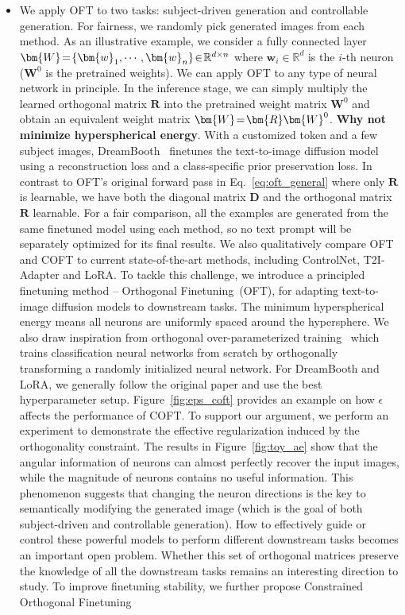\begin{itemize}[leftmargin=*,nosep]
\begin{itemize}[leftmargin=*,nosep]
The conventional finetuning strategy typically uses gradient descent with a small learning rate to update a model (or certain layers of a model). \item We apply OFT to two tasks: subject-driven generation and controllable generation. For fairness, we randomly pick generated images from each method. As an illustrative example, we consider a fully connected layer $\thickmuskip=2mu \medmuskip=2mu \bm{W}=\{\bm{w}_1,\cdots,\bm{w}_n\}\in\mathbb{R}^{d\times n}$ where $\bm{w}_i\in\mathbb{R}^{d}$ is the $i$-th neuron ($\bm{W}^0$ is the pretrained weights). We can apply OFT to any type of neural network in principle. In the inference stage, we can simply multiply the learned orthogonal matrix $\bm{R}$ into the pretrained weight matrix $\bm{W}^0$ and obtain an equivalent weight matrix $\thickmuskip=2mu \medmuskip=2mu \bm{W}=\bm{R}\bm{W}^0$. \textbf{Why not minimize hyperspherical energy}. With a customized token and a few subject images, DreamBooth~\cite{ruiz2023dreambooth} finetunes the text-to-image diffusion model using a reconstruction loss and a class-specific prior preservation loss. In contrast to OFT's original forward pass in Eq.~\eqref{eq:oft_general} where only $\bm{R}$ is learnable, we have both the diagonal matrix $\bm{D}$ and the orthogonal matrix $\bm{R}$ learnable. For a fair comparison, all the examples are generated from the same finetuned model using each method, so no text prompt will be separately optimized for its final results. We also qualitatively compare OFT and COFT to current state-of-the-art methods, including ControlNet, T2I-Adapter and LoRA. To tackle this challenge, we introduce a principled finetuning method -- Orthogonal Finetuning~(OFT), for adapting text-to-image diffusion models to downstream tasks. The minimum hyperspherical energy means all neurons are uniformly spaced around the hypersphere. We also draw inspiration from orthogonal over-parameterized training~\cite{liu2021orthogonal} which trains classification neural networks from scratch by orthogonally transforming a randomly initialized neural network. For DreamBooth and LoRA, we generally follow the original paper and use the best hyperparameter setup. Figure~\ref{fig:eps_coft} provides an example on how $\epsilon$ affects the performance of COFT. To support our argument, we perform an experiment to demonstrate the effective regularization induced by the orthogonality constraint. The results in Figure~\ref{fig:toy_ae} show that the angular information of neurons can almost perfectly recover the input images, while the magnitude of neurons contains no useful information. This phenomenon suggests that changing the neuron directions is the key to semantically modifying the generated image (which is the goal of both subject-driven and controllable generation). How to effectively guide or control these powerful models to perform different downstream tasks becomes an important open problem. Whether this set of orthogonal matrices preserve the knowledge of all the downstream tasks remains an interesting direction to study. To improve finetuning stability, we further propose Constrained Orthogonal Finetuning 
\end{itemize}
\end{itemize}
